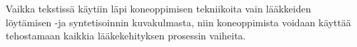 \documentclass[finnish,twoside,censored,tkt,sw-line]{HYthesisML}
\begin{document}
Vaikka tekstissä käytiin läpi koneoppimisen tekniikoita vain lääkkeiden löytämisen -ja syntetisoinnin kuvakulmasta, niin koneoppimista voidaan käyttää tehostamaan kaikkia lääkekehityksen prosessin vaiheita.


\cleardoublepage{}                          %
\printbibliography{}

\backmatter{}



\end{document}
